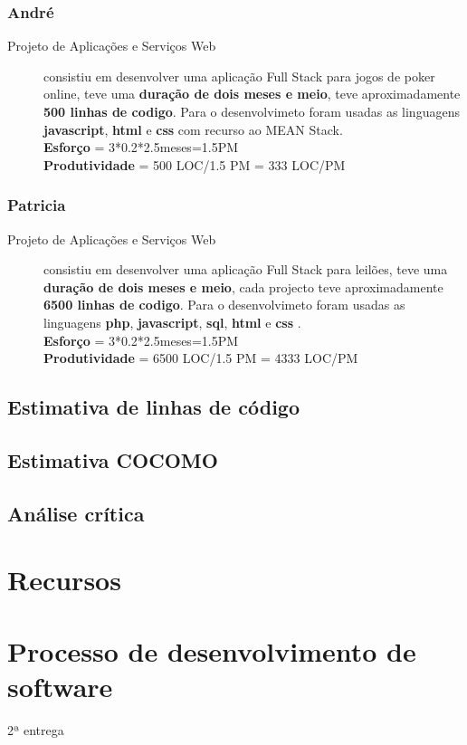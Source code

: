 \documentclass[a4paper]{report}
\begin{document}
\subsubsection*{André}
\begin{description}
    \item[Projeto de Aplicações e Serviços Web] consistiu em desenvolver uma aplicação Full Stack para jogos de poker online, teve uma \textbf{duração de dois meses e meio}, teve aproximadamente \textbf{500 linhas de codigo}. Para o desenvolvimeto foram usadas as linguagens \textbf{javascript}, \textbf{html} e \textbf{css} com recurso ao MEAN Stack.\\\textbf{Esforço} = 3*0.2*2.5meses=1.5PM\\ \textbf{Produtividade} = 500 LOC/1.5 PM = 333 LOC/PM
\end{description}

\subsubsection*{Patricia}
\begin{description}
    \item[Projeto de Aplicações e Serviços Web] consistiu em desenvolver uma aplicação Full Stack para leilões, teve uma \textbf{duração de dois meses e meio}, cada projecto teve aproximadamente \textbf{6500 linhas de codigo}. Para o desenvolvimeto foram usadas as linguagens \textbf{php}, \textbf{javascript}, \textbf{sql}, \textbf{html} e \textbf{css} .\\\textbf{Esforço} = 3*0.2*2.5meses=1.5PM\\ \textbf{Produtividade} = 6500 LOC/1.5 PM = 4333 LOC/PM
\end{description}

\subsection{Estimativa de linhas de código}
\subsection{Estimativa COCOMO}
\subsection{Análise crítica}
\section{Recursos}
\section{Processo de desenvolvimento de software}
2ª entrega
\end{document}
